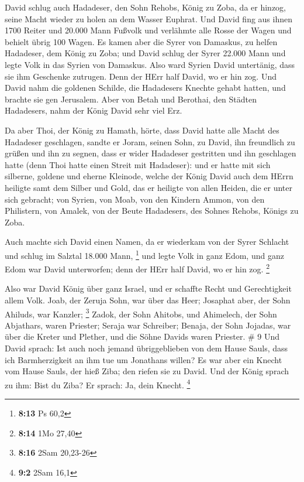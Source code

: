  David schlug auch Hadadeser, den Sohn Rehobs, König zu
Zoba, da er hinzog, seine Macht wieder zu holen an dem Wasser Euphrat.
 Und David fing aus ihnen 1700 Reiter und 20.000 Mann
Fußvolk und verlähmte alle Rosse der Wagen und behielt übrig 100 Wagen.
 Es kamen aber die Syrer von Damaskus, zu helfen Hadadeser,
dem König zu Zoba; und David schlug der Syrer 22.000 Mann 
und legte Volk in das Syrien von Damaskus. Also ward Syrien David
untertänig, dass sie ihm Geschenke zutrugen. Denn der HErr half David,
wo er hin zog.  Und David nahm die goldenen Schilde, die
Hadadesers Knechte gehabt hatten, und brachte sie gen Jerusalem.
 Aber von Betah und Berothai, den Städten Hadadesers, nahm
der König David sehr viel Erz.

 Da aber Thoi, der König zu Hamath, hörte, dass David hatte
alle Macht des Hadadeser geschlagen,  sandte er Joram,
seinen Sohn, zu David, ihn freundlich zu grüßen und ihn zu segnen, dass
er wider Hadadeser gestritten und ihn geschlagen hatte (denn Thoi hatte
einen Streit mit Hadadeser): und er hatte mit sich silberne, goldene und
eherne Kleinode,  welche der König David auch dem HErrn
heiligte samt dem Silber und Gold, das er heiligte von allen Heiden, die
er unter sich gebracht;  von Syrien, von Moab, von den
Kindern Ammon, von den Philistern, von Amalek, von der Beute Hadadesers,
des Sohnes Rehobs, Königs zu Zoba.

 Auch machte sich David einen Namen, da er wiederkam von
der Syrer Schlacht und schlug im Salztal 18.000 Mann, \footnote{\textbf{8:13}
  Ps 60,2}  und legte Volk in ganz Edom, und ganz Edom war
David unterworfen; denn der HErr half David, wo er hin zog. \footnote{\textbf{8:14}
  1Mo 27,40}

 Also war David König über ganz Israel, und er schaffte
Recht und Gerechtigkeit allem Volk.  Joab, der Zeruja Sohn,
war über das Heer; Josaphat aber, der Sohn Ahiluds, war Kanzler;
\footnote{\textbf{8:16} 2Sam 20,23-26}  Zadok, der Sohn
Ahitobs, und Ahimelech, der Sohn Abjathars, waren Priester; Seraja war
Schreiber;  Benaja, der Sohn Jojadas, war über die Kreter
und Plether, und die Söhne Davids waren Priester. \# 9  Und
David sprach: Ist auch noch jemand übriggeblieben von dem Hause Sauls,
dass ich Barmherzigkeit an ihm tue um Jonathans willen?  Es
war aber ein Knecht vom Hause Sauls, der hieß Ziba; den riefen sie zu
David. Und der König sprach zu ihm: Bist du Ziba? Er sprach: Ja, dein
Knecht. \footnote{\textbf{9:2} 2Sam 16,1}

